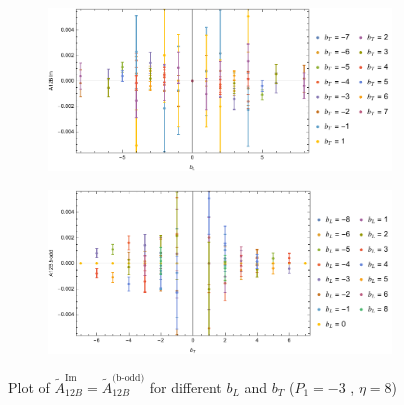 \documentclass[]{article}
\numberwithin{equation}{section}
\newcommand{\tAmp}{\widetilde{A}}
\newcommand{\tAmp}{\ensuremath{\widetilde{A}^{(+)}}}
\begin{document}
\begin{figure}[h!]
     \centering
     \begin{subfigure}[b]{0.45\textwidth}
         \centering
         \includegraphics[width=\textwidth]{Amp_plots/bL_A12B_b_odd_P1_-3_eta_8.pdf}
     \end{subfigure}
     \begin{subfigure}[b]{0.45\textwidth}
         \centering
         \includegraphics[width=\textwidth]{Amp_plots/bT_A12B_b_odd_P1_-3_eta_8.pdf}
     \end{subfigure}
        \caption{Plot of  $\tAmp^{\text{Im}}_{12B}=\tAmp^{\text{(b-odd)}}_{12B}$ for different $b_{L}$ and $b_{T}$  ($P_{1} = -3$ , $\eta=8$)}
\end{figure}
\end{document}
